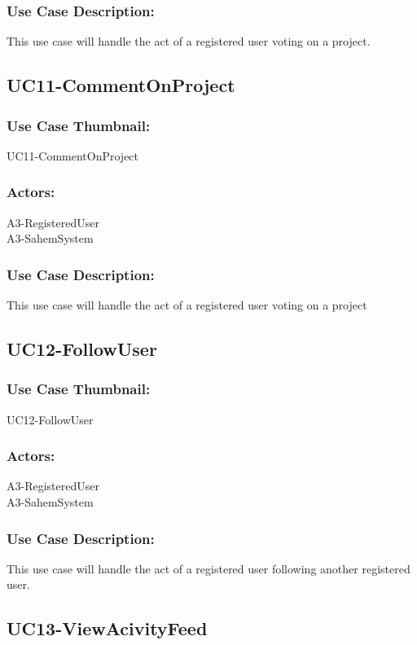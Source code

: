 \documentclass[11pt, openany]{report}
\begin{document}
\subsubsection*{Use Case Description:}
This use case will handle the act of a registered user voting on a project.

\subsection{UC11-CommentOnProject}
\label{sUC11}
\subsubsection*{Use Case Thumbnail:}
UC11-CommentOnProject
\subsubsection*{Actors:}
A3-RegisteredUser\\
A3-SahemSystem

\subsubsection*{Use Case Description:}
This use case will handle the act of a registered user voting on a project

\subsection{UC12-FollowUser}
\label{sUC12}
\subsubsection*{Use Case Thumbnail:}
UC12-FollowUser
\subsubsection*{Actors:}
A3-RegisteredUser\\
A3-SahemSystem

\subsubsection*{Use Case Description:}
This use case will handle the act of a registered user following another registered user.

\subsection{UC13-ViewAcivityFeed}
\label{sUC13}
\end{document}
